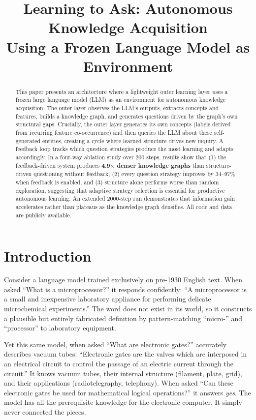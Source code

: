 \documentclass[conference]{IEEEtran}
\title{\textbf{Learning to Ask: Autonomous Knowledge Acquisition\\Using a Frozen Language Model as Environment}}
\author{
    \IEEEauthorblockN{Mohit Aggarwal}
    \IEEEauthorblockA{
        Independent Researcher\\
        \texttt{github.com/aggarwamnew/dream-layer}\\
        DOI: \texttt{10.5281/zenodo.20113782}
    }
}
\begin{document}
\maketitle


\begin{abstract}
This paper presents an architecture where a lightweight outer learning layer uses a frozen large language model (LLM) as an environment for autonomous knowledge acquisition. The outer layer observes the LLM's outputs, extracts concepts and features, builds a knowledge graph, and generates questions driven by the graph's own structural gaps. Crucially, the outer layer generates its own concepts (labels derived from recurring feature co-occurrence) and then queries the LLM about these self-generated entities, creating a cycle where learned structure drives new inquiry. A feedback loop tracks which question strategies produce the most learning and adapts accordingly. In a four-way ablation study over 200 steps, results show that (1) the feedback-driven system produces \textbf{4.9$\times$ denser knowledge graphs} than structure-driven questioning without feedback, (2) every question strategy improves by 34--97\% when feedback is enabled, and (3) structure alone performs worse than random exploration, suggesting that adaptive strategy selection is essential for productive autonomous learning. An extended 2000-step run demonstrates that information gain accelerates rather than plateaus as the knowledge graph densifies. All code and data are publicly available.
\end{abstract}

\section{Introduction}
\label{sec:intro}

Consider a language model trained exclusively on pre-1930 English text. When asked ``What is a microprocessor?'' it responds confidently: ``A microprocessor is a small and inexpensive laboratory appliance for performing delicate microchemical experiments.'' The word does not exist in its world, so it constructs a plausible but entirely fabricated definition by pattern-matching ``micro-'' and ``processor'' to laboratory equipment.

Yet this same model, when asked ``What are electronic gates?'' accurately describes vacuum tubes: ``Electronic gates are the valves which are interposed in an electrical circuit to control the passage of an electric current through the circuit.'' It knows vacuum tubes, their internal structure (filament, plate, grid), and their applications (radiotelegraphy, telephony). When asked ``Can these electronic gates be used for mathematical logical operations?'' it answers \emph{yes}. The model has all the prerequisite knowledge for the electronic computer. It simply never connected the pieces.
\end{document}
